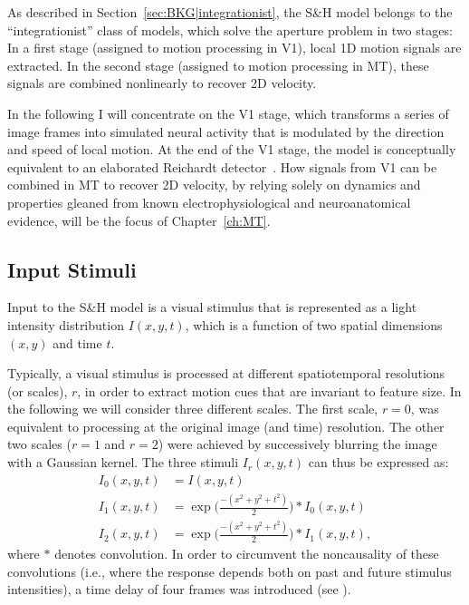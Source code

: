 As described in Section~\ref{sec:BKG|integrationist},
the S\&H model belongs to the ``integrationist'' class of models,
which solve the aperture problem in two stages: 
In a first stage (assigned to motion processing in \ac{V1}), 
local 1D motion signals are extracted.
In the second stage (assigned to motion processing in \ac{MT}), these signals
are combined nonlinearly to recover 2D velocity.

In the following I will concentrate on the \ac{V1} stage, 
which transforms a series of image frames into simulated neural activity
that is modulated by the direction and speed of local motion.
At the end of the \ac{V1} stage, the model is conceptually equivalent to an
elaborated Reichardt detector~\citep{vanSanten1985}.
How signals from \ac{V1} can be combined in \ac{MT} to recover 2D velocity, 
by relying solely on dynamics and properties gleaned from known 
electrophysiological and neuroanatomical evidence, will be the
focus of Chapter~\ref{ch:MT}.


\subsection{Input Stimuli}
\label{sec:ME|V1|input}
Input to the S\&H model is a visual stimulus that is
represented as a light intensity distribution $I(x,y,t)$,
which is a function of two spatial dimensions $(x,y)$ and time $t$.

Typically, a visual stimulus is processed at different spatiotemporal
resolutions (or scales), $r$, in order to extract motion cues that are 
invariant to feature size.
In the following we will consider three different scales.
The first scale, $r=0$, was equivalent to processing at the
original image (and time) resolution. The other two scales ($r=1$ and $r=2$)
were achieved by successively blurring the image with a Gaussian
kernel. The three stimuli $I_r(x,y,t)$ can thus be expressed as:
\begin{align}
I_0(x,y,t) & = I(x,y,t) \label{eqn:ME|SH|stimuli1} \\
I_1(x,y,t) & = \exp\bigg( \frac{-(x^2+y^2+t^2)}{2}\bigg)
	* I_0(x,y,t) \label{eqn:ME|SH|stimuli2} \\
I_2(x,y,t) & = \exp\bigg( \frac{-(x^2+y^2+t^2)}{2}\bigg)
	* I_1(x,y,t), \label{eqn:ME|SH|stimuli3}
\end{align}
where $*$ denotes convolution.
In order to circumvent the noncausality
of these convolutions (i.e., where the response depends both on
past and future stimulus intensities), a time delay of four
frames was introduced (see \cite{SimoncelliHeeger1998}).


